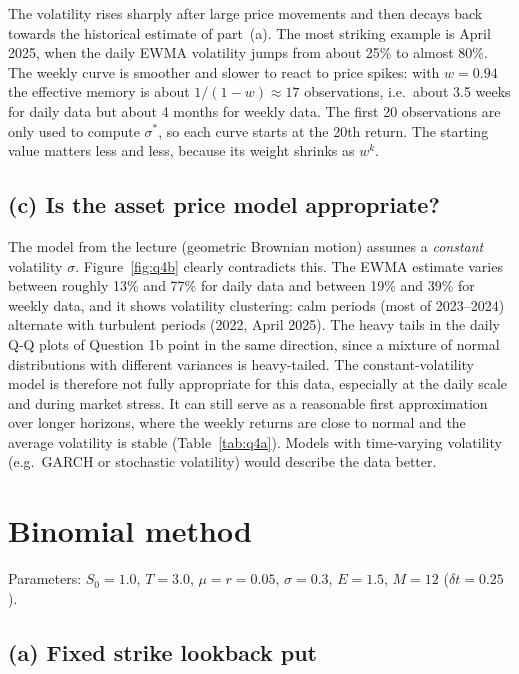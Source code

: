 \documentclass[11pt,a4paper]{article}
\begin{document}
The volatility rises sharply after large price movements and then decays back towards the
historical estimate of part~(a). The most striking example is April 2025, when the daily EWMA
volatility jumps from about 25\% to almost 80\%. The weekly curve is smoother and slower to
react to price spikes: with $w = 0.94$ the effective memory is about $1/(1-w) \approx 17$
observations, i.e.\ about 3.5 weeks for daily data but about 4 months for weekly data. The first
20 observations are only used to compute $\sigma^*$, so each curve starts at the 20th return. The
starting value matters less and less, because its weight shrinks as $w^k$.

\subsection*{(c) Is the asset price model appropriate?}

The model from the lecture (geometric Brownian motion) assumes a \emph{constant} volatility
$\sigma$. Figure~\ref{fig:q4b} clearly contradicts this. The EWMA estimate varies between roughly
13\% and 77\% for daily data and between 19\% and 39\% for weekly data, and it shows volatility
clustering: calm periods (most of 2023--2024) alternate with turbulent periods (2022, April 2025).
The heavy tails in the daily Q-Q plots of Question 1b point in the same direction, since a mixture
of normal distributions with different variances is heavy-tailed. The constant-volatility model is
therefore not fully appropriate for this data, especially at the daily scale and during market
stress. It can still serve as a reasonable first approximation over longer horizons, where the
weekly returns are close to normal and the average volatility is stable (Table~\ref{tab:q4a}).
Models with time-varying volatility (e.g.\ GARCH or stochastic volatility) would describe the data
better.

\section{Binomial method}

Parameters: $S_0 = 1.0$, $T = 3.0$, $\mu = r = 0.05$, $\sigma = 0.3$, $E = 1.5$, $M = 12$
($\delta t = 0.25$).

\subsection*{(a) Fixed strike lookback put}
\end{document}

